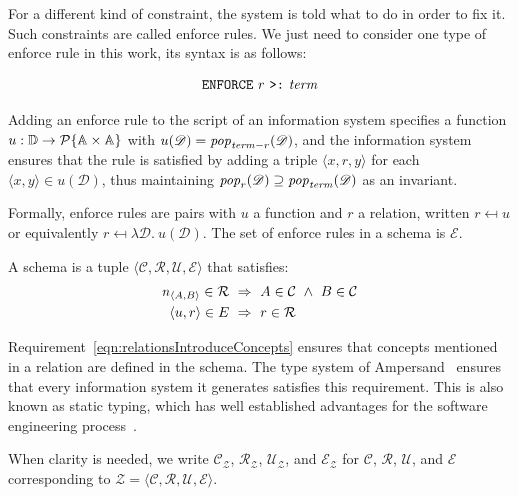 \documentclass[runningheads]{llncs}
\newcommand{\id}[1]{\text{\it #1\/}}
\newcommand{\popF}[1]{\id{pop}_{#1}}
\newcommand{\pop}[2]{\popF{#1}(#2)}
\newcommand{\viol}[2]{{#1}(#2)}
\newcommand{\powerset}[1]{\cal{P}\{#1\}}
\newcommand{\declare}[3]{\id{#1}_{\pair{#2}{#3}}}
\newcommand{\pair}[2]{\langle{#1},{#2}\rangle}
\newcommand{\Pair}[2]{#1\times#2}
\newcommand{\triple}[3]{\langle{#1},{#2},{#3}\rangle}
\newcommand{\quadruple}[4]{\langle{#1},{#2},{#3},{#4}\rangle}
\newcommand{\Atoms}{\mathbb{A}}
\newcommand{\concepts}{\mathcal{C}}
\newcommand{\rels}{\mathcal{R}}   %
\newcommand{\enforces}{\mathcal{E}}
\newcommand{\rules}{\mathcal{U}}
\newcommand{\dataset}{\mathscr{D}}
\newcommand{\Dataset}{\mathbb{D}}
\newcommand{\schema}{\mathscr{Z}}
\newcommand{\infsys}{\mathscr{S}}
\begin{document}
   For a different kind of constraint, the system is told what to do in order to fix it.
   Such constraints are called enforce rules.
   We just need to consider one type of enforce rule in this work, its syntax is as follows:
   
\begin{align}
      \text{\tt ENFORCE}\ r\ \text{\tt >:}\ \id{term}\label{enforce ins}
\end{align}

   Adding an enforce rule to the script of an information system specifies a function $u : \Dataset \to \powerset{\Pair{\Atoms}{\Atoms}}$ with $\viol{u}{\dataset} = \pop{\id{term} - r}{\dataset}$, and the information system ensures that the rule is satisfied by adding a triple $\triple{x}{r}{y}$ for each $\pair{x}{y} \in \viol{u}{\dataset}$, thus maintaining $\pop{r}{\dataset} \supseteq \pop{\id{term}}{\dataset}$ as an invariant.
   
   Formally, enforce rules are pairs with $u$ a function and $r$ a relation, written $r \mapsfrom u$ or equivalently $r \mapsfrom \lambda \dataset.~ u(\dataset)$.
   The set of enforce rules in a schema is $\enforces$.
   
   \begin{definition}[Schema]
   A schema is a tuple $\quadruple{\concepts}{\rels}{\rules}{\enforces}$ that satisfies:
\begin{align}
   \declare{n}{A}{B}\in\rels&~\Rightarrow~ A\in\concepts\ \wedge\ B\in\concepts
   \label{eqn:relationsIntroduceConcepts}\\
   \pair{u}{r}\in\mathcal\enforces&~\Rightarrow~ r \in \rels\label{eqn:enforceRulesRels}
\end{align}
   \end{definition}
   Requirement~\ref{eqn:relationsIntroduceConcepts} ensures that concepts mentioned in a relation are defined in the schema.
   The type system of Ampersand~\cite{vdWoude2011} ensures that every information system it generates satisfies this requirement.
   This is also known as static typing, which has well established advantages for the software engineering process~\cite{HanenbergKRTS14,Petersen2014}.
   
   When clarity is needed, we write $\concepts_{\schema}$, $\rels_{\schema}$, $\rules_{\schema}$, and $\enforces_{\schema}$
   for $\concepts$, $\rels$, $\rules$, and $\enforces$ corresponding to $\schema = \quadruple{\concepts}{\rels}{\rules}{\enforces}$.
\end{document}

